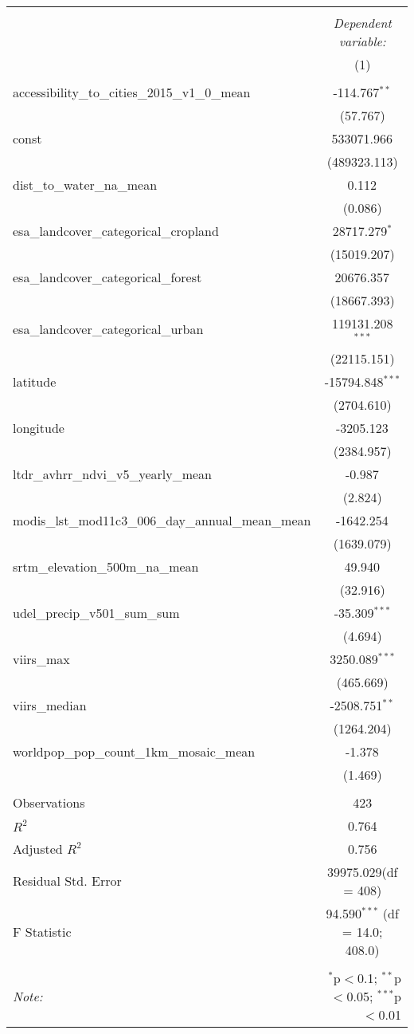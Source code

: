 \begin{table}[!htbp] \centering
\begin{tabular}{@{\extracolsep{5pt}}lc}
\\[-1.8ex]\hline
\hline \\[-1.8ex]
& \multicolumn{1}{c}{\textit{Dependent variable:}} \
\cr \cline{1-2}
\\[-1.8ex] & (1) \\
\hline \\[-1.8ex]
 accessibility_to_cities_2015_v1_0_mean & -114.767$^{**}$ \\
  & (57.767) \\
 const & 533071.966$^{}$ \\
  & (489323.113) \\
 dist_to_water_na_mean & 0.112$^{}$ \\
  & (0.086) \\
 esa_landcover_categorical_cropland & 28717.279$^{*}$ \\
  & (15019.207) \\
 esa_landcover_categorical_forest & 20676.357$^{}$ \\
  & (18667.393) \\
 esa_landcover_categorical_urban & 119131.208$^{***}$ \\
  & (22115.151) \\
 latitude & -15794.848$^{***}$ \\
  & (2704.610) \\
 longitude & -3205.123$^{}$ \\
  & (2384.957) \\
 ltdr_avhrr_ndvi_v5_yearly_mean & -0.987$^{}$ \\
  & (2.824) \\
 modis_lst_mod11c3_006_day_annual_mean_mean & -1642.254$^{}$ \\
  & (1639.079) \\
 srtm_elevation_500m_na_mean & 49.940$^{}$ \\
  & (32.916) \\
 udel_precip_v501_sum_sum & -35.309$^{***}$ \\
  & (4.694) \\
 viirs_max & 3250.089$^{***}$ \\
  & (465.669) \\
 viirs_median & -2508.751$^{**}$ \\
  & (1264.204) \\
 worldpop_pop_count_1km_mosaic_mean & -1.378$^{}$ \\
  & (1.469) \\
\hline \\[-1.8ex]
 Observations & 423 \\
 $R^2$ & 0.764 \\
 Adjusted $R^2$ & 0.756 \\
 Residual Std. Error & 39975.029(df = 408)  \\
 F Statistic & 94.590$^{***}$ (df = 14.0; 408.0) \\
\hline
\hline \\[-1.8ex]
\textit{Note:} & \multicolumn{1}{r}{$^{*}$p$<$0.1; $^{**}$p$<$0.05; $^{***}$p$<$0.01} \\
\end{tabular}
\end{table}